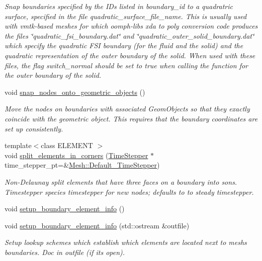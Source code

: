 \begin{DoxyCompactItemize}
\begin{DoxyCompactList}\small\item\em Snap boundaries specified by the I\+Ds listed in boundary\+\_\+id to a quadratric surface, specified in the file quadratic\+\_\+surface\+\_\+file\+\_\+name. This is usually used with vmtk-\/based meshes for which oomph-\/lib\textquotesingle{}s xda to poly conversion code produces the files \char`\"{}quadratic\+\_\+fsi\+\_\+boundary.\+dat\char`\"{} and \char`\"{}quadratic\+\_\+outer\+\_\+solid\+\_\+boundary.\+dat\char`\"{} which specify the quadratic F\+SI boundary (for the fluid and the solid) and the quadratic representation of the outer boundary of the solid. When used with these files, the flag switch\+\_\+normal should be set to true when calling the function for the outer boundary of the solid. \end{DoxyCompactList}\item 
void \hyperlink{classoomph_1_1TetMeshBase_a1670b81c0ed5509661c179d9e46bdd1c}{snap\+\_\+nodes\+\_\+onto\+\_\+geometric\+\_\+objects} ()
\begin{DoxyCompactList}\small\item\em Move the nodes on boundaries with associated Geom\+Objects so that they exactly coincide with the geometric object. This requires that the boundary coordinates are set up consistently. \end{DoxyCompactList}\item 
{\footnotesize template$<$class E\+L\+E\+M\+E\+NT $>$ }\\void \hyperlink{classoomph_1_1TetMeshBase_ae4d5a602fb4a4c6a4ee2fe2a027d0ef6}{split\+\_\+elements\+\_\+in\+\_\+corners} (\hyperlink{classoomph_1_1TimeStepper}{Time\+Stepper} $\ast$time\+\_\+stepper\+\_\+pt=\&\hyperlink{classoomph_1_1Mesh_a12243d0fee2b1fcee729ee5a4777ea10}{Mesh\+::\+Default\+\_\+\+Time\+Stepper})
\begin{DoxyCompactList}\small\item\em Non-\/\+Delaunay split elements that have three faces on a boundary into sons. Timestepper species timestepper for new nodes; defaults to to steady timestepper. \end{DoxyCompactList}\item 
void \hyperlink{classoomph_1_1TetMeshBase_ac372c93f2834c864f7376f1aceda718f}{setup\+\_\+boundary\+\_\+element\+\_\+info} ()
\item 
void \hyperlink{classoomph_1_1TetMeshBase_a5982b96584e7f60eeb62f51153ef29f4}{setup\+\_\+boundary\+\_\+element\+\_\+info} (std\+::ostream \&outfile)
\begin{DoxyCompactList}\small\item\em Setup lookup schemes which establish which elements are located next to mesh\textquotesingle{}s boundaries. Doc in outfile (if it\textquotesingle{}s open). \end{DoxyCompactList}\end{DoxyCompactItemize}
